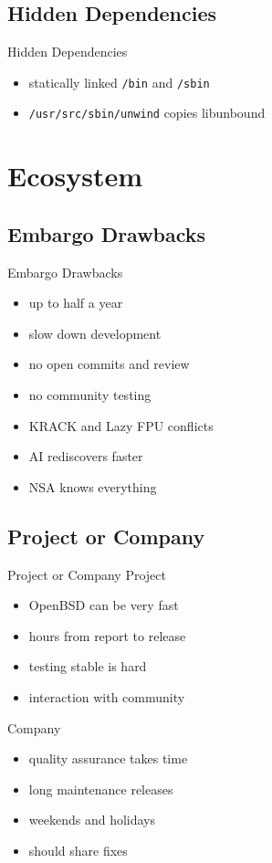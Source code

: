 \documentclass[14pt,aspectratio=169]{beamer}
\begin{document}
\subsection{Hidden Dependencies}
\begin{frame}{Hidden Dependencies}
\begin{itemize}
\item statically linked \texttt{/bin} and \texttt{/sbin}
\item \texttt{/usr/src/sbin/unwind} copies libunbound
\end{itemize}
\end{frame}

\section{Ecosystem}

\subsection{Embargo Drawbacks}
\begin{frame}{Embargo Drawbacks}
\begin{itemize}
\item up to half a year
\item slow down development
\item no open commits and review
\item no community testing
\item KRACK and Lazy FPU conflicts
\item AI rediscovers faster
\item NSA knows everything
\end{itemize}
\end{frame}

\subsection{Project or Company}
\begin{frame}{Project or Company}
Project
\begin{itemize}
\item OpenBSD can be very fast
\item hours from report to release
\item testing stable is hard
\item interaction with community
\end{itemize}
Company
\begin{itemize}
\item quality assurance takes time
\item long maintenance releases
\item weekends and holidays
\item should share fixes
\end{itemize}
\end{frame}
\end{document}
